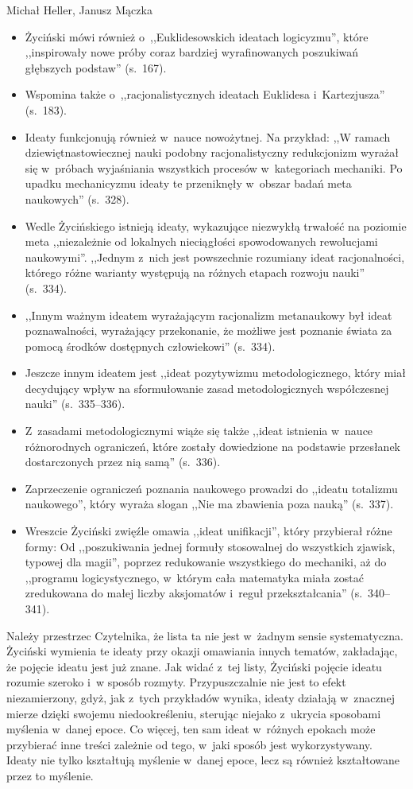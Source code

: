 \begin{newrevplenv2auth}{Michał Heller, Janusz Mączka}
\begin{itemize}
\item Życiński mówi również o~,,Euklidesowskich ideatach logicyzmu'', które ,,inspirowały nowe próby coraz bardziej wyrafinowanych poszukiwań głębszych podstaw'' (s.~167).
\item Wspomina także o~,,racjonalistycznych ideatach Euklidesa i~Kartezjusza'' (s.~183).
\item Ideaty funkcjonują również w~nauce nowożytnej. Na przykład: ,,W ramach dziewiętnastowiecznej nauki podobny racjonalistyczny redukcjonizm wyrażał się w~próbach wyjaśniania wszystkich procesów w~kategoriach mechaniki. Po upadku mechanicyzmu ideaty te przeniknęły w~obszar badań meta naukowych'' (s.~328).
\item Wedle Życińskiego istnieją ideaty, wykazujące niezwykłą trwałość na poziomie meta ,,niezależnie od lokalnych nieciągłości spowodowanych rewolucjami naukowymi''. ,,Jednym z~nich jest powszechnie rozumiany ideat racjonalności, którego różne warianty występują na różnych etapach rozwoju nauki'' (s.~334).
\item ,,Innym ważnym ideatem wyrażającym racjonalizm metanaukowy był ideat poznawalności, wyrażający przekonanie, że możliwe jest poznanie świata za pomocą środków dostępnych człowiekowi'' (s.~334).
\item Jeszcze innym ideatem jest ,,ideat pozytywizmu metodologicznego, który miał decydujący wpływ na sformułowanie zasad metodologicznych współczesnej nauki'' (s.~335--336).
\item Z~zasadami metodologicznymi wiąże się także ,,ideat istnienia w~nauce różnorodnych ograniczeń, które zostały dowiedzione na podstawie przesłanek dostarczonych przez nią samą'' (s.~336).
\item Zaprzeczenie ograniczeń poznania naukowego prowadzi do ,,ideatu totalizmu naukowego'', który wyraża slogan ,,Nie ma zbawienia poza nauką'' (s.~337).
\item Wreszcie Życiński zwięźle omawia ,,ideat unifikacji'', który przybierał różne formy: Od ,,poszukiwania jednej formuły stosowalnej do wszystkich zjawisk, typowej dla magii'', poprzez redukowanie wszystkiego do mechaniki, aż do ,,programu logicystycznego, w~którym cała matematyka miała zostać zredukowana do małej liczby aksjomatów i~reguł przekształcania'' (s.~340--341).
\end{itemize}
Należy przestrzec Czytelnika, że lista ta nie jest w~żadnym sensie systematyczna. Życiński wymienia te ideaty przy okazji omawiania innych tematów, zakładając, że pojęcie ideatu jest już znane. Jak widać z~tej listy, Życiński pojęcie ideatu rozumie szeroko i~w sposób rozmyty. Przypuszczalnie nie jest to efekt niezamierzony, gdyż, jak z~tych przykładów wynika, ideaty działają w~znacznej mierze dzięki swojemu niedookreśleniu, sterując niejako z~ukrycia sposobami myślenia w~danej epoce. Co więcej, ten sam ideat w~różnych epokach może przybierać inne treści zależnie od tego, w~jaki sposób jest wykorzystywany. Ideaty nie tylko kształtują myślenie w~danej epoce, lecz są również kształtowane przez to myślenie.


\end{newrevplenv2auth}
